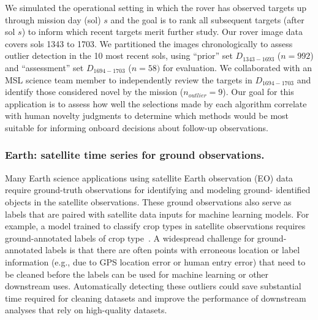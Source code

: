 \documentclass[letterpaper]{article} %
\begin{document}
We simulated the operational setting in which the rover has observed
targets up through mission day (sol) $s$ and the goal is to rank all
subsequent targets (after sol $s$) to inform which recent targets
merit further study.  Our rover image data covers sols \num{1343}
to \num{1703}.  We partitioned the images chronologically to assess
outlier detection in the 10 most recent sols, using ``prior'' set
$D_{1343-1693}$ ($n=992$) and ``assessment'' set $D_{1694-1703}$
($n=58)$ for evaluation. We collaborated with an MSL science team member to
independently review the targets in $D_{1694-1703}$ and identify those
considered novel by the mission ($n_{outlier} = 9$).  Our goal for
this application is to assess how well the selections made by each
algorithm correlate with human novelty judgments to determine which
methods would be most suitable for informing onboard decisions about
follow-up observations.

\subsubsection{Earth: satellite time series for ground observations.}
Many Earth science applications using satellite Earth observation (EO) data
 require ground-truth observations for identifying and modeling ground-
 identified objects in the satellite observations. These ground observations
 also serve as labels that are paired with satellite data inputs for machine 
 learning models. For example, a model trained to classify crop types in
 satellite observations requires ground-annotated labels of crop type~\cite{tseng2021learning}. A widespread challenge for ground-
 annotated labels is that there are often points with erroneous location or 
 label information (e.g., due to GPS location error or human entry error) that
 need to be cleaned before the labels can be used for machine learning or
 other downstream uses. Automatically detecting these outliers could save 
 substantial time required for cleaning datasets and improve the performance of
 downstream analyses that rely on high-quality datasets. 
 
\end{document}
